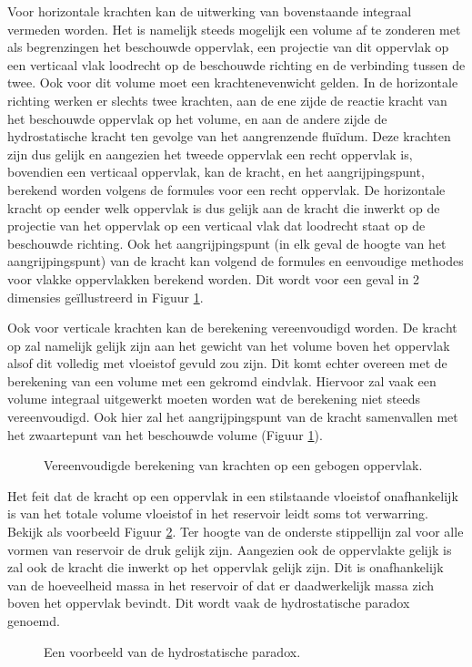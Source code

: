 Voor horizontale krachten kan de uitwerking van bovenstaande integraal vermeden worden. Het is namelijk steeds mogelijk een volume af te zonderen met als begrenzingen het beschouwde oppervlak, een projectie van dit oppervlak op een verticaal vlak loodrecht op de beschouwde richting en de verbinding tussen de twee. Ook voor dit volume moet een krachtenevenwicht gelden. In de horizontale richting werken er slechts twee krachten, aan de ene zijde de reactie kracht van het beschouwde oppervlak op het volume, en aan de andere zijde de hydrostatische kracht ten gevolge van het aangrenzende fluïdum. Deze krachten zijn dus gelijk en aangezien het tweede oppervlak een recht oppervlak is, bovendien een verticaal oppervlak, kan de kracht, en het aangrijpingspunt, berekend worden volgens de formules voor een recht oppervlak. De horizontale kracht op eender welk oppervlak is dus gelijk aan de kracht die inwerkt op de projectie van het oppervlak op een verticaal vlak dat loodrecht staat op de beschouwde richting. Ook het aangrijpingspunt (in elk geval de hoogte van het aangrijpingspunt) van de kracht kan volgend de formules en eenvoudige methodes voor vlakke oppervlakken berekend worden. Dit wordt voor een geval in 2 dimensies geïllustreerd in Figuur \ref{fig:kracht_gebogen_oppervlak_vereenvoudigd_2d}.

Ook voor verticale krachten kan de berekening vereenvoudigd worden. De kracht op zal namelijk gelijk zijn aan het gewicht van het volume boven het oppervlak alsof dit volledig met vloeistof gevuld zou zijn. Dit komt echter overeen met de berekening van een volume met een gekromd eindvlak. Hiervoor zal vaak een volume integraal uitgewerkt moeten worden wat de berekening niet steeds vereenvoudigd. Ook hier zal het aangrijpingspunt van de kracht samenvallen met het zwaartepunt van het beschouwde volume (Figuur \ref{fig:kracht_gebogen_oppervlak_vereenvoudigd_2d}).
\begin{figure}[htb]
	\centering
	
	\caption{Vereenvoudigde berekening van krachten op een gebogen oppervlak.}
	\label{fig:kracht_gebogen_oppervlak_vereenvoudigd_2d}
\end{figure}

Het feit dat de kracht op een oppervlak in een stilstaande vloeistof onafhankelijk is van het totale volume vloeistof in het reservoir leidt soms tot verwarring. Bekijk als voorbeeld Figuur \ref{fig:hydrostatische_paradox}. Ter hoogte van de onderste stippellijn zal voor alle vormen van reservoir de druk gelijk zijn. Aangezien ook de oppervlakte gelijk is zal ook de kracht die inwerkt op het oppervlak gelijk zijn. Dit is onafhankelijk van de hoeveelheid massa in het reservoir of dat er daadwerkelijk massa zich boven het oppervlak bevindt. Dit wordt vaak de hydrostatische paradox genoemd.
\begin{figure}[htb]
	\centering
	
	\caption{Een voorbeeld van de hydrostatische paradox.}
	\label{fig:hydrostatische_paradox}
\end{figure}

